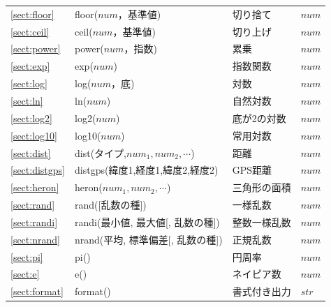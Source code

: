 \begin{table}[!hb]
\begin{center}
{\begin{tabular}{l|l|l|l}
\ref{sect:floor}& floor($num$，基準値)&
切り捨て&
$num$\\

\ref{sect:ceil}& ceil($num$，基準値)&
切り上げ&
$num$\\

\ref{sect:power}& power($num$，指数)&
累乗&
$num$\\

\ref{sect:exp}& exp($num$)&
指数関数&
$num$\\

\ref{sect:log}& log($num$，底)&
対数&
$num$\\

\ref{sect:ln}& ln($num$)&
自然対数&
$num$\\

\ref{sect:log2}& log2($num$)&
底が2の対数&
$num$\\

\ref{sect:log10}& log10($num$)&
常用対数&
$num$\\

\ref{sect:dist}& dist(タイプ,$num_1,num_2,\cdots$)&
距離&
$num$\\

\ref{sect:distgps}& distgps(緯度1,経度1,緯度2,経度2)&
GPS距離&
$num$\\


\ref{sect:heron}& heron($num_1,num_2,\cdots$)&
三角形の面積&
$num$\\

\ref{sect:rand}& rand([乱数の種])&
一様乱数&
$num$\\

\ref{sect:randi}& randi(最小値, 最大値[, 乱数の種])&
整数一様乱数&
$num$\\

\ref{sect:nrand}& nrand(平均, 標準偏差[, 乱数の種])&
正規乱数&
$num$\\

\ref{sect:pi}& pi()&
円周率&
$num$\\

\ref{sect:e}& e()&
ネイピア数&
$num$\\

\ref{sect:format}& format()&
書式付き出力&
$str$\\

\hline
  \end{tabular}
  }
  \end{center}
\end{table}



